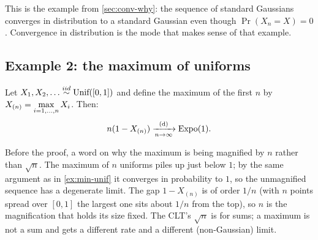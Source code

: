 This is the example from \cref{sec:conv-why}: the sequence of standard Gaussians converges in distribution to a standard Gaussian even though $\Pr(X_n = X) = 0$.
Convergence in distribution is the mode that makes sense of that example.

\subsection{Example 2: the maximum of uniforms}

\begin{example}
\label{ex:max-unif}
Let $X_1, X_2, \ldots \stackrel{iid}{\sim} \text{Unif}([0,1])$ and define the maximum of the first $n$ by $\displaystyle X_{(n)} = \max_{i=1,\ldots,n} X_i$.
Then:
\[
n(1 - X_{(n)}) \xrightarrow [n \to \infty ]{\text{(d)}} \text{Expo}(1).
\]
\end{example}

Before the proof, a word on why the maximum is being magnified by $n$ rather than $\sqrt{n}$.
The maximum of $n$ uniforms piles up just below $1$; by the same argument as in \cref{ex:min-unif} it converges in probability to $1$, so the unmagnified sequence has a degenerate limit.
The gap $1 - X_{(n)}$ is of order $1/n$ (with $n$ points spread over $[0,1]$ the largest one sits about $1/n$ from the top), so $n$ is the magnification that holds its size fixed.
The CLT's $\sqrt{n}$ is for sums; a maximum is not a sum and gets a different rate and a different (non-Gaussian) limit.

